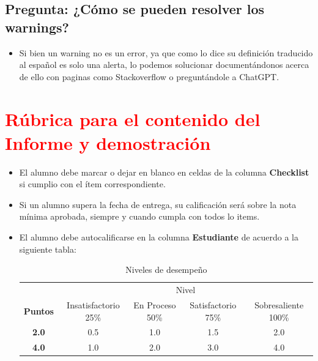 \documentclass{article}
\begin{document}
\subsection{Pregunta: ¿Cómo se pueden resolver los warnings?}
\begin{itemize}
	\item Si bien un warning no es un error, ya que como lo dice su definición traducido al español
	es solo una alerta, lo podemos solucionar documentándonos acerca de ello con paginas como Stackoverflow
	o preguntándole a ChatGPT.
\end{itemize}   
	\clearpage
	\section{\textcolor{red}{Rúbrica para el contenido del Informe y demostración}}
	\begin{itemize}			
		\item El alumno debe marcar o dejar en blanco en celdas de la columna \textbf{Checklist} si cumplio con el ítem correspondiente.
		\item Si un alumno supera la fecha de entrega,  su calificación será sobre la nota mínima aprobada, siempre y cuando cumpla con todos lo items.
		\item El alumno debe autocalificarse en la columna \textbf{Estudiante} de acuerdo a la siguiente tabla:
	
		\begin{table}[ht]
			\caption{Niveles de desempeño}
			\begin{center}
			\begin{tabular}{ccccc}
    			\hline
    			 & \multicolumn{4}{c}{Nivel}\\
    			\cline{1-5}
    			\textbf{Puntos} & Insatisfactorio 25\%& En Proceso 50\% & Satisfactorio 75\% & Sobresaliente 100\%\\
    			\textbf{2.0}&0.5&1.0&1.5&2.0\\
    			\textbf{4.0}&1.0&2.0&3.0&4.0\\
    		\hline
			\end{tabular}
		\end{center}
	\end{table}	
	
	\end{itemize}
	
\end{document}
